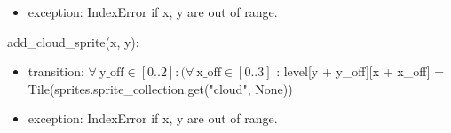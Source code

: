 \documentclass[12pt]{article}
\begin{document}
\begin{itemize}
\begin{table}[H]
\begin{tabular}{lllll}
                                                                  &                                                                                            &                                                                                                                                                                                                                                                                                                       &  &  \\
                                                                  &                                                                                            &                                                                                                                                                                                                                                                                                                       &  &  \\
                                                                  &                                                                                            &                                                                                                                                                                                                                                                                                                       &  & 
\end{tabular}
\end{table}

    \item exception: IndexError if x, y are out of range.
\end{itemize}

add\_cloud\_sprite(x, y):
\begin{itemize}
    \item transition: $\forall\ \text{y\_off} \in [0 .. 2] : (\forall\ \text{x\_off} \in [0 .. 3]$ : level[y + y\_off][x + x\_off] = Tile(sprites.sprite\_collection.get("cloud", None))
    \item exception: IndexError if x, y are out of range.
\end{itemize}
\end{document}

